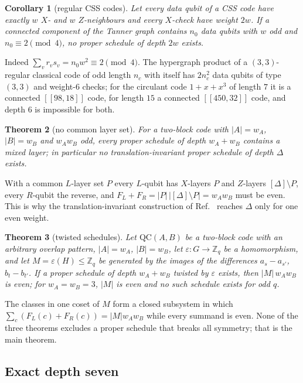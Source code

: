 \documentclass[reprint,twocolumn,superscriptaddress,nofootinbib]{revtex4-2}
\theoremstyle{plain}
\newtheorem{theorem}{Theorem}
\newtheorem{corollary}[theorem]{Corollary}
\newcommand{\Zq}{\mathbb{Z}_q}
\newcommand{\wA}{w_A}                  %
\newcommand{\wB}{w_B}
\begin{document}
\begin{corollary}[regular CSS codes]
\label{cor:regular}
Let every data qubit of a CSS code have exactly $w$ $X$- and $w$
$Z$-neighbours and every $X$-check have weight $2w$. If a connected
component of the Tanner graph contains $n_0$ data qubits with $w$ odd and
$n_0\equiv2\pmod 4$, no proper schedule of depth $2w$ exists.
\end{corollary}

Indeed $\sum_vr_vs_v=n_0w^2\equiv2\pmod4$. The hypergraph product of a
$(3,3)$-regular classical code of odd length $n_c$ with itself has
$2n_c^2$ data qubits of type $(3,3)$ and weight-$6$ checks; for the
circulant code $1+x+x^3$ of length $7$ it is a connected $[[98,18]]$ code,
for length $15$ a connected $[[450,32]]$ code, and depth $6$ is impossible
for both.

\begin{theorem}[no common layer set]
\label{thm:nomixed}
For a two-block code with $|A|=\wA$, $|B|=\wB$ and $\wA\wB$ odd, every
proper schedule of depth $\wA+\wB$ contains a mixed layer; in particular no
translation-invariant proper schedule of depth $\Delta$ exists.
\end{theorem}

With a common $L$-layer set $P$ every $L$-qubit has $X$-layers $P$ and
$Z$-layers $[\Delta]\setminus P$, every $R$-qubit the reverse, and
$F_L+F_R=|P|\,|[\Delta]\setminus P|=\wA\wB$ must be even. This is why the
translation-invariant construction of Ref.~\cite{Nguyen2026} reaches
$\Delta$ only for one even weight.

\begin{theorem}[twisted schedules]
\label{thm:twisted}
Let $\mathrm{QC}(A,B)$ be a two-block code with an arbitrary overlap
pattern, $|A|=\wA$, $|B|=\wB$, let $\varepsilon:G\to\Zq$ be a
homomorphism, and let $M=\varepsilon(H)\le\Zq$ be generated by the images
of the differences $a_s-a_{s'}$, $b_t-b_{t'}$. If a proper schedule of depth
$\wA+\wB$ twisted by $\varepsilon$ exists, then $|M|\,\wA\wB$ is even; for
$\wA=\wB=3$, $|M|$ is even and no such schedule exists for odd $q$.
\end{theorem}

The classes in one coset of $M$ form a closed subsystem in which
$\sum_c(F_L(c)+F_R(c))=|M|\wA\wB$ while every summand is even. None of the
three theorems excludes a proper schedule that breaks all symmetry; that
is the main theorem.

\subsection{Exact depth seven}
\label{sec:main}
\end{document}
